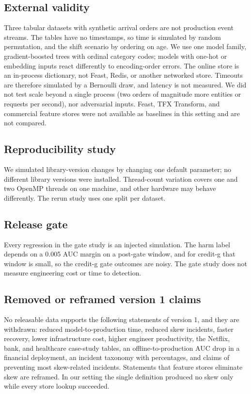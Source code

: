 \documentclass[journal]{IEEEtran}
\begin{document}
\subsection{External validity}
Three tabular datasets with synthetic arrival orders are not production event streams. The tables have no timestamps, so time is simulated by random permutation, and the shift scenario by ordering on age. We use one model family, gradient-boosted trees with ordinal category codes; models with one-hot or embedding inputs react differently to encoding-order errors. The online store is an in-process dictionary, not Feast, Redis, or another networked store. Timeouts are therefore simulated by a Bernoulli draw, and latency is not measured. We did not test scale beyond a single process (two orders of magnitude more entities or requests per second), nor adversarial inputs. Feast, TFX Transform, and commercial feature stores were not available as baselines in this setting and are not compared.

\subsection{Reproducibility study}
We simulated library-version changes by changing one default parameter; no different library versions were installed. Thread-count variation covers one and two OpenMP threads on one machine, and other hardware may behave differently. The rerun study uses one split per dataset.

\subsection{Release gate}
Every regression in the gate study is an injected simulation. The harm label depends on a 0.005 AUC margin on a post-gate window, and for credit-g that window is small, so the credit-g gate outcomes are noisy. The gate study does not measure engineering cost or time to detection.

\subsection{Removed or reframed version 1 claims}
No releasable data supports the following statements of version 1, and they are withdrawn: reduced model-to-production time, reduced skew incidents, faster recovery, lower infrastructure cost, higher engineer productivity, the Netflix, bank, and healthcare case-study tables, an offline-to-production AUC drop in a financial deployment, an incident taxonomy with percentages, and claims of preventing most skew-related incidents. Statements that feature stores eliminate skew are reframed. In our setting the single definition produced no skew only while every store lookup succeeded.
\end{document}
